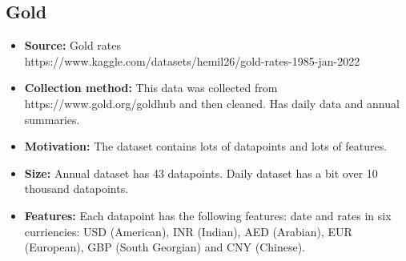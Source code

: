 \subsection{Gold}
\begin{itemize}
	\item \textbf{Source:} Gold rates \\ https://www.kaggle.com/datasets/hemil26/gold-rates-1985-jan-2022
	\item \textbf{Collection method:} This data was collected from https://www.gold.org/goldhub and then cleaned. Has daily data and annual summaries.
	\item \textbf{Motivation:} The dataset contains lots of datapoints and lots of features.
	\item \textbf{Size:} Annual dataset has 43 datapoints. Daily dataset has a bit over 10 thousand datapoints.
	\item \textbf{Features:} Each datapoint has the following features: date and rates in six curriencies: USD (American), INR (Indian), AED (Arabian), EUR (European), GBP (South Georgian) and CNY (Chinese).
\end{itemize}
